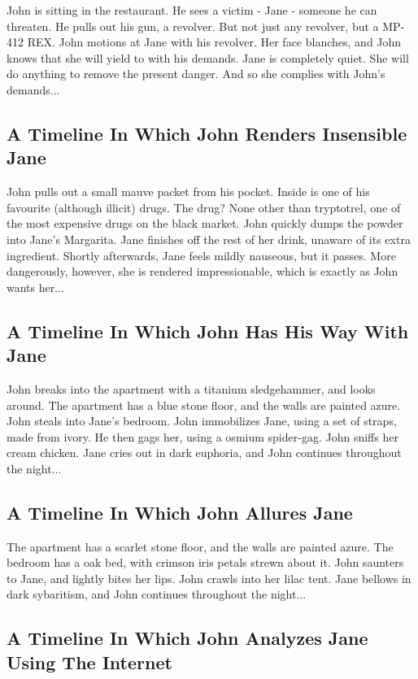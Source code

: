 \documentclass{article}
\begin{document}
John is sitting in the restaurant.
He sees a victim {-} Jane {-} someone he can threaten. He pulls out his gun, a revolver.
But not just any revolver, but a MP{-}412 REX.
John motions at Jane with his revolver. Her face blanches, and John knows that she will yield to with his demands.
Jane is completely quiet. She will do anything to remove the present danger. And so she complies with John's demands...
\subsection{A Timeline In Which John Renders Insensible Jane}


John pulls out a small mauve packet from his pocket. Inside is one of his favourite (although illicit) drugs.
The drug? None other than tryptotrel, one of the most expensive drugs on the black market.
John quickly dumps the powder into Jane's Margarita.
Jane finishes off the rest of her drink, unaware of its extra ingredient.
Shortly afterwards, Jane feels mildly nauseous, but it passes.
More dangerously, however, she is rendered impressionable, which is exactly as John wants her...
\subsection{A Timeline In Which John Has His Way With Jane}


John breaks into the apartment with a titanium sledgehammer, and looks around.
The apartment has a blue stone floor, and the walls are painted azure.
John steals into Jane's bedroom.
John immobilizes Jane, using a set of straps, made from ivory.
He then gags her, using a osmium spider{-}gag.
John sniffs her cream chicken.
Jane cries out in dark euphoria, and John continues throughout the night...
\subsection{A Timeline In Which John Allures Jane}


The apartment has a scarlet stone floor, and the walls are painted azure.
The bedroom has a oak bed, with crimson iris petals strewn about it.
John saunters to Jane, and lightly bites her lips.
John crawls into her lilac tent.
Jane bellows in dark sybaritism, and John continues throughout the night...
\subsection{A Timeline In Which John Analyzes Jane Using The Internet}
\end{document}
